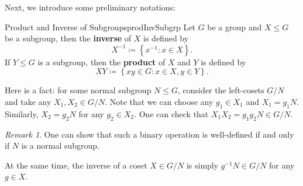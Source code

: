 \documentclass[math]{amznotes}
\theoremstyle{remark}
\newtheorem*{remark}{Remark}
\newcommand{\0}{\mathbf{0}}
\newcommand{\1}{\mathbf{1}}
\begin{document}
Next, we introduce some preliminary notations:
\begin{dfnbox}{Product and Inverse of Subgroups}{prodInvSubgrp}
    Let $G$ be a group and $X\leq G$ be a subgroup, then the {\color{red} \textbf{inverse}} of $X$ is defined by 
    \begin{equation*}
        X^{-1} \coloneqq \left\{x^{-1} \colon x \in X\right\}.
    \end{equation*}
    If $Y \leq G$ is a subgroup, then the {\color{red} \textbf{product}} of $X$ and $Y$ is defined by 
    \begin{equation*}
        XY \coloneqq \left\{xy \in G \colon x \in X, y \in Y\right\}.
    \end{equation*}
\end{dfnbox}
Here is a fact: for some normal subgroup $N \leq G$, consider the left-cosets $G \slash N$ and take any $X_1, X_2 \in G \slash N$. Note that we can choose any $g_1 \in X_1$ and $X_1 = g_1N$. Similarly, $X_2 = g_2N$ for any $g_2 \in X_2$. One can check that $X_1X_2 = g_1g_2N \in G \slash N$.
\begin{notebox}
    \begin{remark}
        One can show that such a binary operation is well-defined if and only if $N$ is a normal subgroup.
    \end{remark}
\end{notebox}

At the same time, the inverse of a coset $X \in G \slash N$ is simply $g^{-1}N \in G \slash N$ for any $g \in X$.
\end{document}
